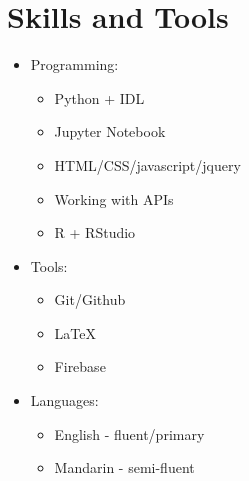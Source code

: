 \documentclass[letterpaper]{article}
\begin{document}
\section*{Skills and Tools}
\begin{itemize}
\item Programming:
  \begin{itemize}
  \item Python + IDL
  \item Jupyter Notebook
  \item HTML/CSS/javascript/jquery
  \item Working with APIs
  \item R + RStudio
  \end{itemize}
\item Tools:
  \begin{itemize}
  \item Git/Github  
  \item LaTeX
  \item Firebase
  \end{itemize}
\item Languages:
  \begin{itemize}
  \item English - fluent/primary
  \item Mandarin - semi-fluent
  \end{itemize}
\end{itemize}
\end{document}
